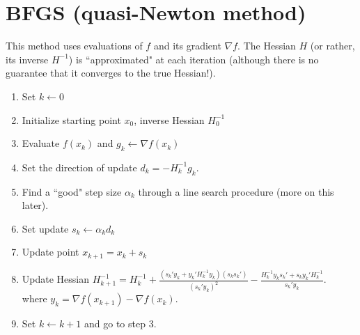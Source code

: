 \documentclass[12pt]{article}
\begin{document}
\section{BFGS (quasi-Newton method)}
This method uses evaluations of $f$ and its gradient $\nabla f$. The Hessian $H$ (or rather, its inverse $H^{-1}$) is ``approximated" at each iteration (although there is no guarantee that it converges to the true Hessian!).
\begin{enumerate}
	\item Set $k \leftarrow 0$
	\item Initialize starting point $x_0$, inverse Hessian $H_0^{-1}$
	\item Evaluate $f(x_k)$ and $g_k \leftarrow \nabla f(x_k)$
	\item Set the direction of update $d_{k} = -H^{-1}_{k} g_k $.
	\item Find a ``good" step size $\alpha_k$ through a line search procedure (more on this later).
	\item Set update $s_k \leftarrow \alpha_k d_k$
	\item Update point $x_{k+1} = x_k + s_k$
	\item Update Hessian $H^{-1}_{k+1} = H^{-1}_{k} + \frac{(s_k' y_k + y_k' H^{-1}_k y_k)(s_k s_k')}{(s_k' y_k)^2} - \frac{H^{-1}_k y_k s_k' + s_k y_k' H^{-1}_k}{s_k' y_k} $. \\
	where $y_k = \nabla f(x_{k+1}) - \nabla f(x_k)$.
	\item Set $k \leftarrow k + 1$ and go to step 3.
\end{enumerate}
\end{document}
